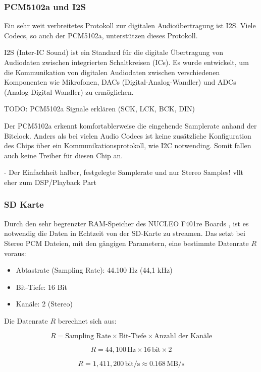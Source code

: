 \subsubsection{PCM5102a und I2S}

Ein sehr weit verbreitetes Protokoll zur digitalen Audioübertragung ist I2S. Viele Codecs, so auch der PCM5102a, unterstützen dieses Protokoll.

I2S (Inter-IC Sound) ist ein Standard für die digitale Übertragung von Audiodaten zwischen integrierten Schaltkreisen (ICs). Es wurde entwickelt, um die Kommunikation von digitalen Audiodaten zwischen verschiedenen Komponenten wie Mikrofonen, DACs (Digital-Analog-Wandler) und ADCs (Analog-Digital-Wandler) zu ermöglichen. 

TODO: PCM5102a Signale erklären (SCK, LCK, BCK, DIN)

Der PCM5102a erkennt komfortablerweise die eingehende Samplerate anhand der Bitclock.
Anders als bei vielen Audio Codecs ist keine zusätzliche Konfiguration des Chips über ein Kommunikationsprotokoll, wie I2C notwending.
Somit fallen auch keine Treiber für diesen Chip an.

- Der Einfachheit halber, festgelegte Samplerate und nur Stereo Samples! vllt eher zum DSP/Playback Part


\subsubsection{SD Karte}

Durch den sehr begrenzter RAM-Speicher des NUCLEO F401re Boards , ist es notwendig die Daten in Echtzeit von der SD-Karte zu streamen. Das setzt bei Stereo PCM Dateien, mit den gängigen Parametern, eine bestimmte Datenrate \( R \) voraus:

\begin{itemize}
	\item Abtastrate (Sampling Rate): 44.100 Hz (44,1 kHz)
	\item Bit-Tiefe: 16 Bit
	\item Kanäle: 2 (Stereo)
\end{itemize}


Die Datenrate \( R \) berechnet sich aus:

\[
R = \text{Sampling Rate} \times \text{Bit-Tiefe} \times \text{Anzahl der Kanäle}
\]



\[
R = 44{,}100 \, \text{Hz} \times 16 \, \text{bit} \times 2
\]

\[
R = 1{,}411{,}200 \, \text{bit/s} \approx 0.168 \, \text{MB/s}
\]



